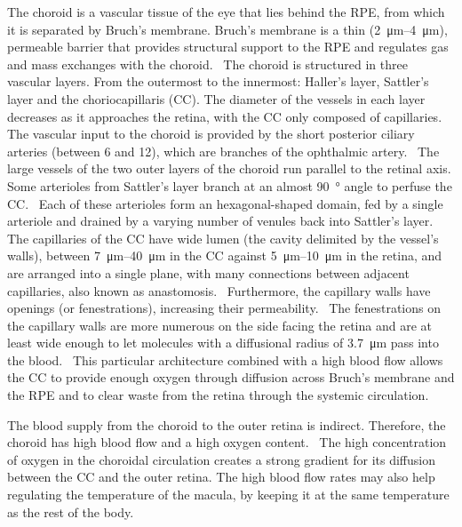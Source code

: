 \documentclass{article}
\begin{document}
The choroid is a vascular tissue of the eye that lies behind the RPE, from which it is separated by Bruch's membrane.
Bruch's membrane is a thin (\SIrange{2}{4}{\micro\meter}), permeable barrier that provides structural support to the RPE and regulates gas and mass exchanges with the choroid.~\cite{Curcio_2013}
The choroid is structured in three vascular layers.
From the outermost to the innermost: Haller's layer, Sattler's layer and the choriocapillaris (CC).
The diameter of the vessels in each layer decreases as it approaches the retina, with the CC only composed of capillaries.
The vascular input to the choroid is provided by the short posterior ciliary arteries (between 6 and 12), which are branches of the ophthalmic artery.~\cite{Kiel_2010}
The large vessels of the two outer layers of the choroid run parallel to the retinal axis.
Some arterioles from Sattler's layer branch at an almost \SI{90}{\degree} angle to perfuse the CC.~\cite{Nickla_2010}
Each of these arterioles form an hexagonal-shaped domain, fed by a single arteriole and drained by a varying number of venules back into Sattler's layer.~\cite{Zouache_2016}
The capillaries of the CC have wide lumen (the cavity delimited by the vessel's walls), between \SIrange{7}{40}{\micro\meter} in the CC against \SIrange{5}{10}{\micro\meter} in the retina, and are arranged into a single plane, with many connections between adjacent capillaries, also known as anastomosis.~\cite{Bill_1983, ChanLing_2011,Fryczkowski_1994}
Furthermore, the capillary walls have openings (or fenestrations), increasing their permeability.~\cite{Nickla_2010}
The fenestrations on the capillary walls are more numerous on the side facing the retina and are at least wide enough to let molecules with a diffusional radius of \SI{3.7}{\micro\meter} pass into the blood.~\cite{Nickla_2010, Bill_1983}
This particular architecture combined with a high blood flow allows the CC to provide enough oxygen through diffusion across Bruch's membrane and the RPE and to clear waste from the retina through the systemic circulation.

The blood supply from the choroid to the outer retina is indirect.
Therefore, the choroid has high blood flow and a high oxygen content.~\cite{Bill_1983}
The high concentration of oxygen in the choroidal circulation creates a strong gradient for its diffusion between the CC and the outer retina.
The high blood flow rates may also help regulating the temperature of the macula, by keeping it at the same temperature as the rest of the body.~\cite{Bill_1983, Parver_1991}
\end{document}
